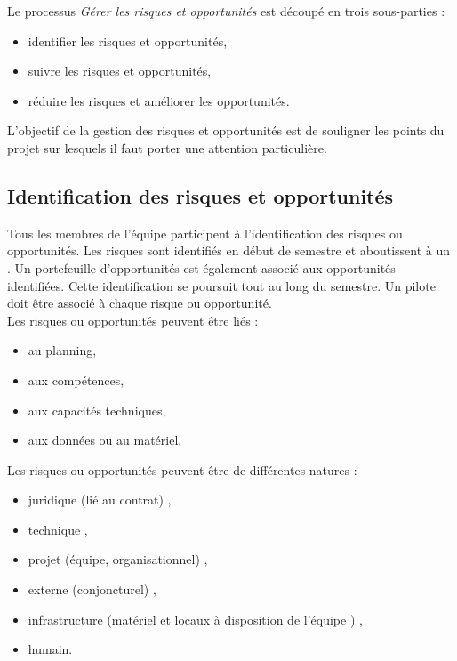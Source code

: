 Le processus \textit{Gérer les risques et opportunités} est découpé en trois sous-parties : 
\begin{itemize}
\item identifier les risques et opportunités,
\item suivre les risques et opportunités,
\item réduire les risques et améliorer les opportunités. \\
\end{itemize}

L'objectif de la gestion des risques et opportunités est de souligner les points du projet sur lesquels il faut porter une attention particulière. 

\subsection{Identification des risques et opportunités}
\label{identification_risques_opportunitees}

Tous les membres de l'équipe participent à l'identification des risques ou opportunités. Les risques sont identifiés en début de semestre et aboutissent à un \PR. Un portefeuille d'opportunités est également associé aux opportunités identifiées. Cette identification se poursuit tout au long du semestre. Un pilote doit être associé à chaque risque ou opportunité.\\ 

Les risques ou opportunités peuvent être liés :
\begin{itemize}
\item au planning,
\item aux compétences,
\item aux capacités techniques,
\item aux données ou au matériel. \\
\end{itemize}

Les risques ou opportunités peuvent être de différentes natures :
\begin{itemize}
 \item juridique (lié au contrat) ,
 \item technique ,
 \item projet (équipe, organisationnel) ,
 \item externe (conjoncturel) ,
 \item infrastructure (matériel et locaux à disposition de l’équipe \PICCourt) ,
 \item humain. \\
\end{itemize}


